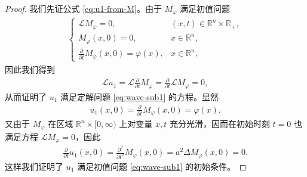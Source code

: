 \documentclass[../../main.tex]{subfiles}%
\begin{document}
\begin{proof}
我们先证公式 \eqref{eq:u1-from-M}。由于 $M_\varphi$ 满足初值问题
\begin{align*}
\begin{cases}
\mathcal{L}M_\varphi=0, & (x,t)\in\mathbb{R}^n\times\mathbb{R}_+, \\
M_\varphi(x,0)=0, & x\in\mathbb{R}^n, \\
\frac{\partial}{\partial t}M_\varphi(x,0)=\varphi(x), & x\in\mathbb{R}^n,
\end{cases}
\end{align*}
因此我们得到
\begin{align*}
\mathcal{L}u_1=\mathcal{L}\frac{\partial}{\partial t}M_\varphi=\frac{\partial}{\partial t}\mathcal{L}M_\varphi=0,
\end{align*}
从而证明了 $u_1$ 满足定解问题 \eqref{eq:wave-sub1} 的方程。显然
\begin{align*}
u_1(x,0)=\frac{\partial}{\partial t}M_\varphi(x,0)=\varphi(x).
\end{align*}
又由于 $M_\varphi$ 在区域 $\mathbb{R}^n\times[0,\infty)$ 上对变量 $x,t$ 充分光滑，因而在初始时刻 $t=0$ 也满足方程 $\mathcal{L}M_\varphi=0$，因此
\begin{align*}
\frac{\partial}{\partial t}u_1(x,0)=\frac{\partial^2}{\partial t^2}M_\varphi(x,0)=a^2\Delta M_\varphi(x,0)=0.
\end{align*}
这样我们证明了 $u_1$ 满足初值问题 \eqref{eq:wave-sub1} 的初始条件。


\end{proof}
\end{document}
